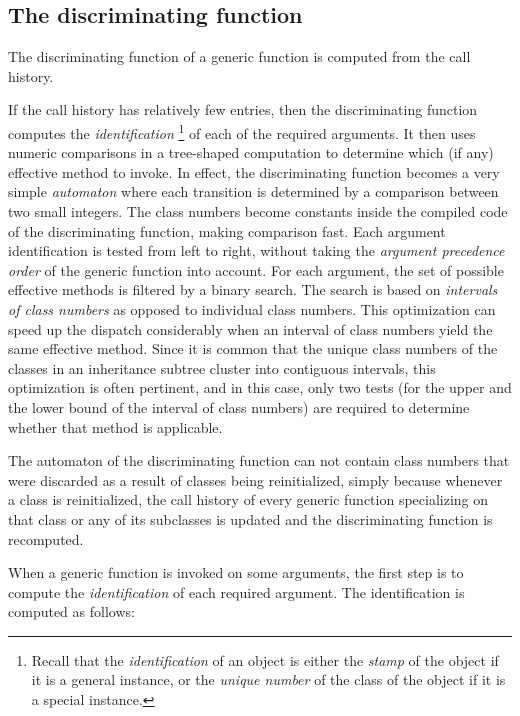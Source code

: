 \subsection{The discriminating function}
\label{sec-generic-function-dispatch-the-discriminating-function}

The discriminating function of a generic function is computed from the
call history.

If the call history has relatively few entries, then the
discriminating function computes the \emph{identification}%
\footnote{Recall that the \emph{identification} of an object is either
  the \emph{stamp} of the object if it is a general instance, or the
  \emph{unique number} of the class of the object if it is a special
  instance.}
of each of the required arguments.  It then uses numeric comparisons
in a tree-shaped computation to determine which (if any) effective
method to invoke.  In effect, the discriminating function becomes a
very simple \emph{automaton} where each transition is determined by a
comparison between two small integers.  The class numbers become
constants inside the compiled code of the discriminating function,
making comparison fast.  Each argument identification is tested from
left to right, without taking the \emph{argument precedence order} of
the generic function into account.  For each argument, the set of
possible effective methods is filtered by a binary search.  The search
is based on \emph{intervals of class numbers} as opposed to individual
class numbers.  This optimization can speed up the dispatch
considerably when an interval of class numbers yield the same
effective method.  Since it is common that the unique class numbers of
the classes in an inheritance subtree cluster into contiguous
intervals, this optimization is often pertinent, and in this
case, only two tests (for the upper and the lower bound of the
interval of class numbers) are required to determine whether that
method is applicable.

The automaton of the discriminating function can not contain class
numbers that were discarded as a result of classes being
reinitialized, simply because whenever a class is reinitialized, the
call history of every generic function specializing on that class or
any of its subclasses is updated and the discriminating function is
recomputed.

When a generic function is invoked on some arguments, the first step
is to compute the \emph{identification} of each required argument.
The identification is computed as follows:


